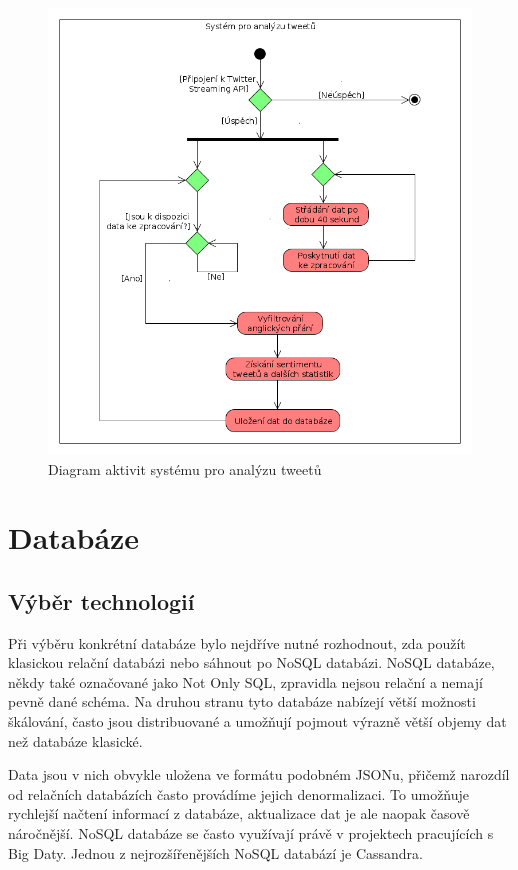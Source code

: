 \documentclass[thesis=B,czech]{FITthesis}[2012/06/26]
\begin{document}
\begin{figure}[h]
   	\centering
   	\includegraphics[width=1\textwidth]{images/activity-diagram.png}
   	\caption{Diagram aktivit systému pro analýzu tweetů}
   	\label{fig:activity_diagram}
\end{figure}

\section{Databáze}
\subsection{Výběr technologií}
	Při výběru konkrétní databáze bylo nejdříve nutné rozhodnout, zda použít klasickou relační databázi nebo sáhnout po NoSQL databázi. NoSQL databáze, někdy také označované jako Not Only SQL, zpravidla nejsou relační a nemají pevně dané schéma. Na druhou stranu tyto databáze nabízejí větší možnosti škálování, často jsou distribuované a umožňují pojmout výrazně větší objemy dat než databáze klasické\cite{nosql-dbs}. 
	
	Data jsou v nich obvykle uložena ve formátu podobném JSONu, přičemž narozdíl od relačních databázích často provádíme jejich denormalizaci. To umožňuje rychlejší načtení informací z databáze, aktualizace dat je ale naopak časově náročnější. NoSQL databáze se často využívají právě v projektech pracujících s Big Daty. Jednou z nejrozšířenějších NoSQL databází je Cassandra. 
	
\end{document}
